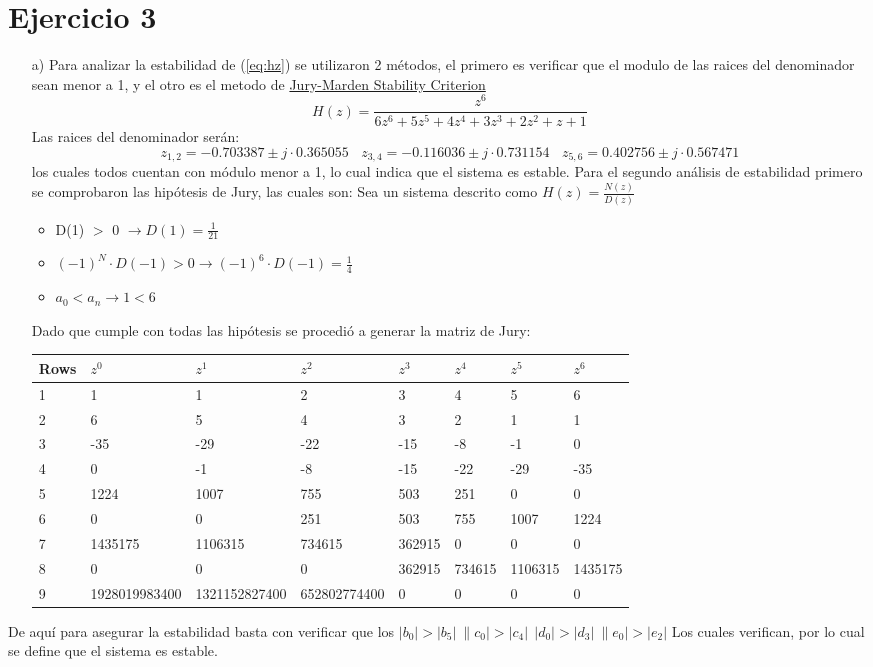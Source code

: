 \section*{Ejercicio 3}
\begin{itemize}
	\item[a)]
		Para analizar la estabilidad de (\ref{eq:hz}) se utilizaron 2 métodos, el primero es verificar que el modulo de las raices del denominador sean menor a 1, y el otro es el metodo de \href{https://en.wikibooks.org/wiki/Control_Systems/Jurys_Test}{Jury-Marden Stability Criterion}
		\begin{equation}
		H(z)=\frac{z^6}{6z^6+5z^5+4z^4+3z^3+2z^2+z+1}
		\label{eq:hz}
		\end{equation}
		Las raices del denominador serán:
		\begin{equation}
		z_{1,2}=-0.703387 \pm j \cdot 0.365055 \ \ \ \ 		z_{3,4}=-0.116036 \pm j\cdot  0.731154 \ \ \ \ z_{5,6}=0.402756 \pm j\cdot  0.567471
		\end{equation}
		los cuales todos cuentan con módulo menor a 1, lo cual indica que el sistema es estable.
		Para el segundo análisis de estabilidad
		primero se comprobaron las hipótesis de Jury, las cuales son:
		Sea un sistema descrito como $H(z) = \frac{N(z)}{D(z)}$
		\\
		\begin{itemize}
		\item D(1) $>$ 0 $\rightarrow D(1)=\frac{1}{21}$
				\item $(-1)^N \cdot D(-1) > 0 \rightarrow (-1)^6 \cdot D(-1)=\frac{1}{4}$
				\item $a_0 < a_n \rightarrow 1<6$
		\end{itemize}
		Dado que cumple con todas las hipótesis se procedió a generar la matriz de Jury:
		\begin{table}[H]
\centering
\begin{tabular}{llllllll}
\multicolumn{1}{c}{Rows} & $z^0$ & $z^1$ & $z^2$ & $z^3$ & $z^4$ & $z^5$ & $z^6$ \\ \hline
\multicolumn{1}{l|}{1} & 1 & 1 & 2 & 3 & 4 & 5 & 6 \\
\multicolumn{1}{l|}{2} & 6 & 5 & 4 & 3 & 2 & 1 & 1 \\
\multicolumn{1}{l|}{3} & -35 & -29 & -22 & -15 & -8 & -1 & 0 \\
\multicolumn{1}{l|}{4} & 0 & -1 & -8 & -15 & -22 & -29 & -35 \\
\multicolumn{1}{l|}{5} & 1224 & 1007 & 755 & 503 & 251 & 0 & 0 \\
\multicolumn{1}{l|}{6} & 0 & 0 & 251 & 503 & 755 & 1007 & 1224 \\
\multicolumn{1}{l|}{7} & 1435175 & 1106315 & 734615 & 362915 & 0 & 0 & 0 \\
\multicolumn{1}{l|}{8} & 0 & 0 & 0 & 362915 & 734615 & 1106315 & 1435175 \\
\multicolumn{1}{l|}{9} & 1928019983400 & 1321152827400 & 652802774400 & 0 & 0 & 0 & 0
\end{tabular}
\end{table}

\end{itemize}
De aquí para asegurar la estabilidad basta con verificar que los  $|b_0| > |b_{5}| \ \|c_0| > |c_{4}| \ \ |d_0| > |d_{3}| \ \|e_0| > |e_{2}|$
Los cuales verifican, por lo cual se define que el sistema es estable.


